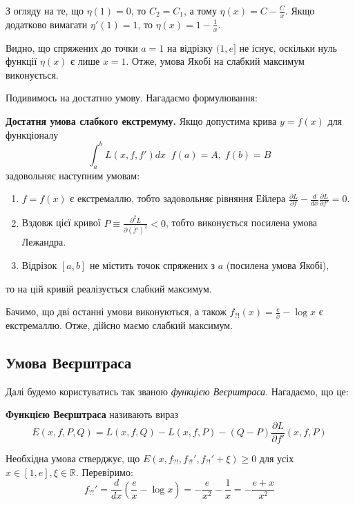 \documentclass[14pt]{extarticle}
\newcommand{\<}{\langle}
\renewcommand{\>}{\rangle}
\theoremstyle{mystyle}{\newtheorem{definition}{Definition}[section]}
\theoremstyle{mystyle}{\newtheorem{proposition}[definition]{Proposition}}
\theoremstyle{mystyle}{\newtheorem{theorem}[definition]{Theorem}}
\theoremstyle{mystyle}{\newtheorem{lemma}[definition]{Lemma}}
\theoremstyle{mystyle}{\newtheorem{corollary}[definition]{Corollary}}
\theoremstyle{mystyle}{\newtheorem*{remark}{Remark}}
\theoremstyle{mystyle}{\newtheorem*{remarks}{Remarks}}
\theoremstyle{mystyle}{\newtheorem*{example}{Example}}
\theoremstyle{mystyle}{\newtheorem*{examples}{Examples}}
\theoremstyle{definition}{\newtheorem*{exercise}{Exercise}}
\theoremstyle{cstyle}{\newtheorem*{cthm}{}}
\theoremstyle{warn}
\begin{document}
З огляду на те, що $\eta(1)=0$, то $C_2=C_1$, а тому $\eta(x) = C-\frac{C}{x}$. Якщо додатково вимагати $\eta'(1)=1$, то $\eta(x) = 1-\frac{1}{x}$.

Видно, що спряжених до точки $a=1$ на відрізку $(1,e]$ не існує, оскільки нуль функції $\eta(x)$ є лише $x=1$. Отже, умова Якобі на слабкий максимум виконується.

Подивимось на достатню умову. Нагадаємо формулювання:
\begin{theorem}
    \textbf{Достатня умова слабкого екстремуму.} Якщо допустима крива $y=f(x)$ для функціоналу
    \begin{equation}
        \int_a^b L(x,f,f')dx \; \; f(a)=A, \; f(b)=B
    \end{equation}
    задовольняє наступним умовам:
    \begin{enumerate}
        \item $f=f(x)$ є екстремаллю, тобто задовольняє рівняння Ейлера $\frac{\partial L}{\partial f} - \frac{d}{dx}\frac{\partial L}{\partial f'} = 0$.
        \item Вздовж цієї кривої $P \equiv \frac{\partial^2 L}{\partial (f')^2} < 0$, тобто виконується посилена умова Лежандра.
        \item Відрізок $[a,b]$ не містить точок спряжених з $a$ (посилена умова Якобі),
    \end{enumerate}

    то на цій кривій реалізується слабкий максимум.
\end{theorem}

Бачимо, що дві останні умови виконуються, а також $f_{?!}(x)=\frac{e}{x}-\log x$ є екстремаллю. Отже, дійсно маємо слабкий максимум.

\subsection{Умова Веєрштраса}

Далі будемо користуватись так званою \textit{функцією Веєрштраса}. Нагадаємо, що це:

\begin{definition}
    \textbf{Функцією Веєрштраса} називають вираз
    \begin{equation}
        E(x,f,P,Q) = L(x,f,Q) - L(x,f,P) - (Q-P)\frac{\partial L}{\partial f'}(x,f,P)
    \end{equation}
\end{definition}

Необхідна умова стверджує, що $E(x,f_{?!},f_{?!}',f_{?!}'+\xi) \geq 0$ для усіх $x \in [1,e], \xi \in \mathbb{R}$. Перевіримо:
\begin{equation}
    f_{?!}' = \frac{d}{dx}\left(\frac{e}{x}-\log x\right) = -\frac{e}{x^2}-\frac{1}{x} = -\frac{e+x}{x^2}
\end{equation}
\end{document}
